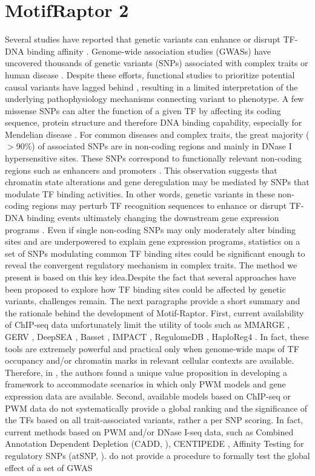 \documentclass[a4paper, titlepage, openright]{book}
\newcommand{\mychapter}[2]{
    \setcounter{chapter}{#1}
    \setcounter{section}{0}
    \chapter*{#2}
    \addcontentsline{toc}{chapter}{#2}
}
\newcommand{\motifraptor}{MotifRaptor\xspace}
\begin{document}
\mychapter{6}{\motifraptor2}
Several studies have reported that genetic variants can enhance or disrupt TF-DNA binding affinity \citep{de2006regulatory, weinhold2014genome, wienert2015editing}. Genome-wide association studies (GWASs) have uncovered thousands of genetic variants (SNPs) associated with complex traits or human disease \citep{buniello2019nhgri}. Despite these efforts, functional studies to prioritize potential causal variants have lagged behind \citep{gallagher2018post}, resulting in a limited interpretation of the underlying pathophysiology mechanisms connecting variant to phenotype. A few missense SNPs can alter the function of a given TF by affecting its coding sequence, protein structure and therefore DNA binding capability, especially for Mendelian disease \citep{barrera2016survey}. For common diseases and complex traits, the great majority ($>$90\%) of associated SNPs are in non-coding regions and mainly in DNase I hypersensitive sites. These SNPs correspond to functionally relevant non-coding regions such as enhancers and promoters \citep{maurano2012systematic}. This observation suggests that chromatin state alterations and gene deregulation may be mediated by SNPs that modulate TF binding activities. In other words, genetic variants in these non-coding regions may perturb TF recognition sequences to enhance or disrupt TF-DNA binding events ultimately changing the downstream gene expression programs \citep{deplancke2016genetics}. Even if single non-coding SNPs may only moderately alter binding sites and are underpowered to explain gene expression programs, statistics on a set of SNPs modulating common TF binding sites could be significant enough to reveal the convergent regulatory mechanism in complex traits. The method we present is based on this key idea.Despite the fact that several approaches have been proposed to explore how TF binding sites could be affected by genetic variants, challenges remain. The next paragraphs provide a short summary and the rationale behind the development of Motif-Raptor. First, current availability of ChIP-seq data unfortunately limit the utility of tools such as MMARGE \citep{link2018mmarge}, GERV \citep{zeng2016gerv}, DeepSEA \citep{zhou2015predicting}, Basset \citep{kelley2016basset}, IMPACT \citep{amariuta2019impact}, RegulomeDB \citep{boyle2012annotation}, HaploReg4 \citep{ward2012haploreg}. In fact, these tools are extremely powerful and practical only when genome-wide maps of TF occupancy and/or chromatin marks in relevant cellular contexts are available. Therefore, in \citep{yao2021motif}, the authors found a unique value proposition in developing a framework to accommodate scenarios in which only PWM models and gene expression data are available. Second, available models based on ChIP-seq or PWM data do not systematically provide a global ranking and the significance of the TFs based on all trait-associated variants, rather a per SNP scoring. In fact, current methods based on PWM and/or DNase I-seq data, such as Combined Annotation Dependent Depletion (CADD, \citep{maurano2015large}), CENTIPEDE \citep{moyerbrailean2016genetics, pique2011accurate}, Affinity Testing for regulatory SNPs (atSNP, \citep{zuo2015atsnp}). do not provide a procedure to formally test the global effect of a set of GWAS 
\end{document}
